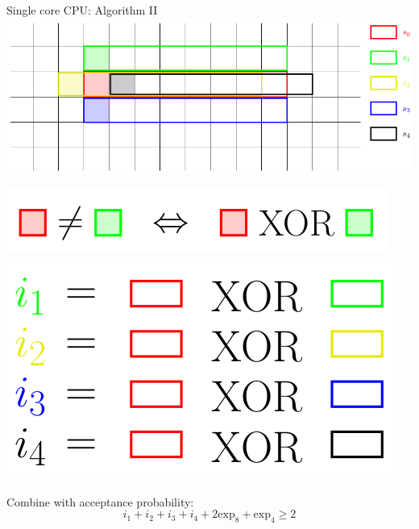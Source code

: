 \documentclass{beamer}
\begin{document}
\begin{frame}{Single core CPU: Algorithm II}
\includegraphics[keepaspectratio=true, width=\textwidth]{images/single_core2.png}\\ \pause
\begin{minipage}{0.5\textwidth}
    \includegraphics[keepaspectratio=true, width=\textwidth]{images/single_core3.png}\\ \pause
    \includegraphics[keepaspectratio=true, width=\textwidth]{images/single_core4.png} \pause
\end{minipage}
\hfill\vline\hfill \pause
\begin{minipage}{0.4\textwidth}
    Combine with acceptance probability:
    \begin{equation*}
        i_1 + i_2 + i_3 + i_4 + 2 \text{exp}_8 + \text{exp}_4 \geq 2
    \end{equation*}
\end{minipage}
\end{frame}
\end{document}
